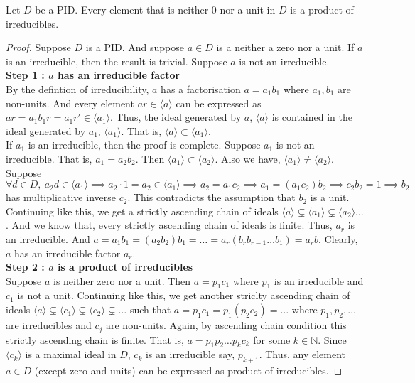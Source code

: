 \begin{theorem}
	Let $D$ be a PID.
	Every element that is neither $0$ nor a unit in $D$ is a product of irreducibles.
\end{theorem}
\begin{proof}
	Suppose $D$ is a PID.
	And suppose $a \in D$ is a neither a zero nor a unit.
	If $a$ is an irreducible, then the result is trivial.
	Suppose $a$ is not an irreducible.\\

	\textbf{Step 1 : $a$ has an irreducible factor}\\
	By the defintion of irreducibility, $a$ has a factorisation $a = a_1b_1$ where $a_1,b_1$ are non-units.
	And every element $ar \in \langle a \rangle$ can be expressed as $ar = a_1b_1r = a_1r' \in \langle a_1 \rangle$.
	Thus, the ideal generated by $a$, $\langle a \rangle$ is contained in the ideal generated by $a_1$, $\langle a_1 \rangle$.
	That is, $\langle a \rangle \subset \langle a_1 \rangle$.\\

	If $a_1$ is an irreducible, then the proof is complete.
	Suppose $a_1$ is not an irreducible.
	That is, $a_1 = a_2b_2$.
	Then $\langle a_1 \rangle \subset \langle a_2 \rangle$.
	Also we have, $\langle a_1 \rangle \ne \langle a_2 \rangle$.\\

	Suppose $\forall d \in D,\ a_2d \in \langle a_1 \rangle \implies a_2\cdot 1 = a_2 \in \langle a_1 \rangle \implies a_2 = a_1c_2 \implies a_1 = (a_1c_2)b_2 \implies c_2b_2 = 1 \implies b_2$ has multiplicative inverse $c_2$. This contradicts the assumption that $b_2$ is a unit.\\

	Continuing like this, we get a {\color{red}strictly} ascending chain of ideals $\langle a \rangle \subsetneq \langle a_1 \rangle \subsetneq \langle a_2 \rangle \dots $.
	And we know that, every strictly ascending chain of ideals is finite.
	Thus, $a_r$ is an irreducible.
	And $a = a_1b_1 = (a_2b_2)b_1 = \dots = a_r(b_rb_{r-1}\dots b_1) = a_rb$.
	Clearly, $a$ has an irreducible factor $a_r$.\\

	\textbf{Step 2 : $a$ is a product of irreducibles}\\
	Suppose $a$ is neither zero nor a unit.
	Then $a = p_1c_1$ where $p_1$ is an irreducible and $c_1$ is not a unit.
	Continuing like this, we get another striclty ascending chain of ideals $\langle a \rangle \subsetneq \langle c_1 \rangle \subsetneq \langle c_2 \rangle \subsetneq \dots$ such that $a = p_1c_1 = p_1(p_2c_2) = \dots$ where $p_1,p_2,\dots$ are irreducibles and $c_j$ are non-units.
	Again, by ascending chain condition this strictly ascending chain is finite.
	That is, $a = p_1p_2\dots p_kc_k$ for some $k \in \mathbb{N}$.
	Since $\langle c_k \rangle$ is a maximal ideal in $D$, $c_k$ is an irreducible say, $p_{k+1}$.
	Thus, any element $a \in D$ (except zero and units) can be expressed as product of irreducibles.
\end{proof}

